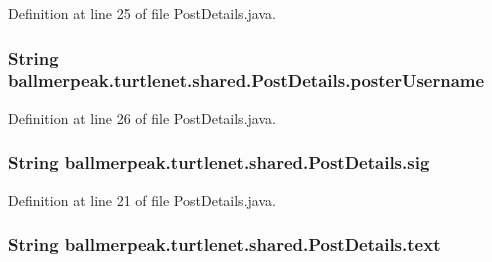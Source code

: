 Definition at line 25 of file Post\-Details.\-java.

\hypertarget{classballmerpeak_1_1turtlenet_1_1shared_1_1PostDetails_a15dfe34395623678a63f569dc9339cbd}{
\subsubsection[{poster\-Username}]{\setlength{\rightskip}{0pt plus 5cm}String ballmerpeak.\-turtlenet.\-shared.\-Post\-Details.\-poster\-Username}}\label{classballmerpeak_1_1turtlenet_1_1shared_1_1PostDetails_a15dfe34395623678a63f569dc9339cbd}


Definition at line 26 of file Post\-Details.\-java.

\hypertarget{classballmerpeak_1_1turtlenet_1_1shared_1_1PostDetails_ac6f606b33cca7c5be0e3eb908241bf8e}{
\subsubsection[{sig}]{\setlength{\rightskip}{0pt plus 5cm}String ballmerpeak.\-turtlenet.\-shared.\-Post\-Details.\-sig}}\label{classballmerpeak_1_1turtlenet_1_1shared_1_1PostDetails_ac6f606b33cca7c5be0e3eb908241bf8e}


Definition at line 21 of file Post\-Details.\-java.

\hypertarget{classballmerpeak_1_1turtlenet_1_1shared_1_1PostDetails_a28dbe8ca59c66a80b1d0538f5485314d}{
\subsubsection[{text}]{\setlength{\rightskip}{0pt plus 5cm}String ballmerpeak.\-turtlenet.\-shared.\-Post\-Details.\-text}}\label{classballmerpeak_1_1turtlenet_1_1shared_1_1PostDetails_a28dbe8ca59c66a80b1d0538f5485314d}


